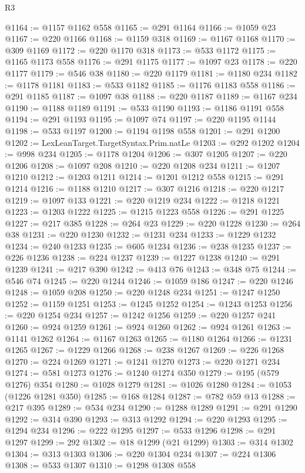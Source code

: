 \begin{lexlean}{R3}
\begin{coremodule}
@1164 := @1157 @1162 @558
@1165 := @291 @1164
@1166 := @1059 @23
@1167 := @220 @1166
@1168 := @1159 @318
@1169 := @1167 @1168
@1170 := @309 @1169
@1172 := @220 @1170 @318
@1173 := @533 @1172
@1175 := @1165 @1173 @558
@1176 := @291 @1175
@1177 := @1097 @23
@1178 := @220 @1177
@1179 := @546 @38
@1180 := @220 @1179
@1181 := @1180 @234
@1182 := @1178 @1181
@1183 := @533 @1182
@1185 := @1176 @1183 @558
@1186 := @291 @1185
@1187 := @1097 @38
@1188 := @220 @1187
@1189 := @1167 @234
@1190 := @1188 @1189
@1191 := @533 @1190
@1193 := @1186 @1191 @558
@1194 := @291 @1193
@1195 := @1097 @74
@1197 := @220 @1195 @1144
@1198 := @533 @1197
@1200 := @1194 @1198 @558
@1201 := @291 @1200
@1202 := LexLeanTarget.TargetSyntax.Prim.natLe
@1203 := @292 @1202
@1204 := @998 @234
@1205 := @1178 @1204
@1206 := @307 @1205
@1207 := @220 @1206
@1208 := @1097 @208
@1210 := @220 @1208 @234
@1211 := @1207 @1210
@1212 := @1203 @1211
@1214 := @1201 @1212 @558
@1215 := @291 @1214
@1216 := @1188 @1210
@1217 := @307 @1216
@1218 := @220 @1217
@1219 := @1097 @133
@1221 := @220 @1219 @234
@1222 := @1218 @1221
@1223 := @1203 @1222
@1225 := @1215 @1223 @558
@1226 := @291 @1225
@1227 := @217 @385
@1228 := @264 @23
@1229 := @220 @1228
@1230 := @264 @38
@1231 := @220 @1230
@1232 := @1231 @234
@1233 := @1229 @1232
@1234 := @240 @1233
@1235 := @605 @1234
@1236 := @238 @1235
@1237 := @226 @1236
@1238 := @224 @1237
@1239 := @1227 @1238
@1240 := @291 @1239
@1241 := @217 @390
@1242 := @413 @76
@1243 := @348 @75
@1244 := @546 @74
@1245 := @220 @1244
@1246 := @1059 @186
@1247 := @220 @1246
@1248 := @1059 @208
@1250 := @220 @1248 @234
@1251 := @1247 @1250
@1252 := @1159 @1251
@1253 := @1245 @1252
@1254 := @1243 @1253
@1256 := @220 @1254 @234
@1257 := @1242 @1256
@1259 := @220 @1257 @241
@1260 := @924 @1259
@1261 := @924 @1260
@1262 := @924 @1261
@1263 := @1141 @1262
@1264 := @1167 @1263
@1265 := @1180 @1264
@1266 := @1231 @1265
@1267 := @1229 @1266
@1268 := @238 @1267
@1269 := @226 @1268
@1270 := @224 @1269
@1271 := @1241 @1270
@1273 := @220 @1271 @234
@1274 := @581 @1273
@1276 := @1240 @1274 @350
@1279 := @195 (@579 @1276) @354
@1280 := @1028 @1279
@1281 := @1026 @1280
@1284 := @1053 (@1226 @1281 @350)
@1285 := @168 @1284
@1287 := @782 @59 @13
@1288 := @217 @395
@1289 := @534 @234
@1290 := @1288 @1289
@1291 := @291 @1290
@1292 := @314 @390
@1293 := @313 @1292
@1294 := @220 @1293
@1295 := @1294 @234
@1296 := @222 @1295
@1297 := @533 @1296
@1298 := @291 @1297
@1299 := 292
@1302 := @18 @1299 (@21 @1299)
@1303 := @314 @1302
@1304 := @313 @1303
@1306 := @220 @1304 @234
@1307 := @224 @1306
@1308 := @533 @1307
@1310 := @1298 @1308 @558

\end{coremodule}
\end{lexlean}
